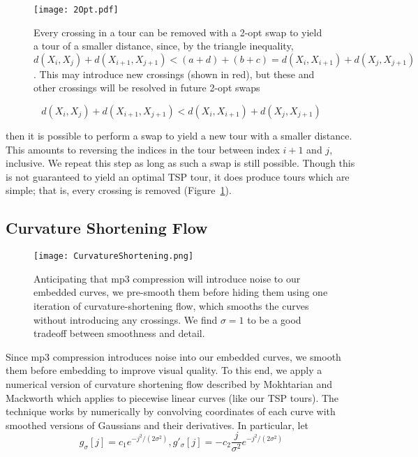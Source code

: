 \documentclass[runningheads]{llncs}
\begin{document}
\begin{figure}
  \begin{minipage}[c]{0.6\textwidth}
    \caption{
      Every crossing in a tour can be removed with a 2-opt swap to yield a tour of a smaller distance, since, by the triangle inequality, $d(X_i, X_j) + d(X_{i+1}, X_{j+1}) < (a+d) + (b+c) = d(X_i, X_{i+1}) + d(X_j, X_{j+1})$.  This may introduce new crossings (shown in red), but these and other crossings will be resolved in future 2-opt swaps
    } \label{fig:TwoOpt}
  \end{minipage}
  \begin{minipage}[c]{0.38\textwidth}
    \texttt{[image: 2Opt.pdf]}
  \end{minipage}\hfill
  
\end{figure}

\begin{equation}
  d(X_i, X_j) + d(X_{i+1}, X_{j+1}) < d(X_i, X_{i+1}) + d(X_j, X_{j+1})
\end{equation}

then it is possible to perform a swap to yield a new tour with a smaller distance.  This amounts to reversing the indices in the tour between index $i+1$ and $j$, inclusive.  We repeat this step as long as such a swap is still possible.  Though this is not guaranteed to yield an optimal TSP tour, it does produce tours which are simple; that is, every crossing is removed (Figure~\ref{fig:TwoOpt}).


\subsection{Curvature Shortening Flow}

\begin{figure}
  \centering
  \texttt{[image: CurvatureShortening.png]}
  \caption{Anticipating that mp3 compression will introduce noise to our embedded curves, we pre-smooth them before hiding them using one iteration of curvature-shortening flow, which smooths the curves without introducing any crossings.  We find $\sigma=1$ to be a good tradeoff between smoothness and detail.}
  \label{fig:CurvatureShortening}
\end{figure}


Since mp3 compression introduces noise into our embedded curves, we smooth them before embedding to improve visual quality.  To this end, we apply a numerical version of curvature shortening flow described by Mokhtarian and Mackworth \cite{mokhtarian1992theory} which applies to piecewise linear curves (like our TSP tours).  The technique works by numerically by convolving coordinates of each curve with smoothed versions of Gaussians and their derivatives.  In particular, let 
\begin{equation}
  g_{\sigma}[j] = c_1 e^{-j^2 / (2 \sigma^2)}, 
  g'_{\sigma}[j] = - c_2 \frac{j}{\sigma^2} e^{-j^2 / (2 \sigma^2)}
\end{equation}
\end{document}

